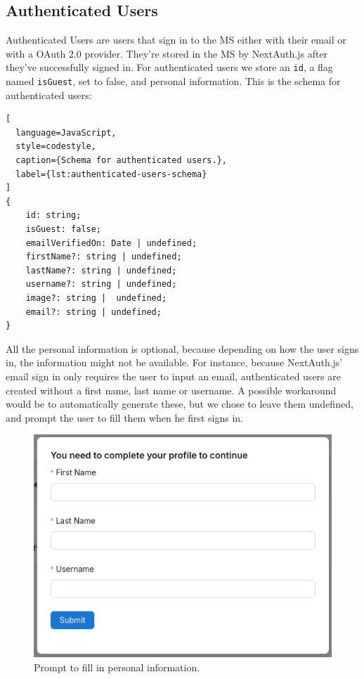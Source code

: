 \subsection{Authenticated Users}
\label{cha:ms-architecture:authenticated-users}

Authenticated Users are users that sign in to the MS either with their email or with a
OAuth 2.0 provider.
They're stored in the MS by NextAuth.js after they've successfully signed in.
For authenticated users we store an \lstinline{id}, a flag named \lstinline{isGuest}, set
to false, and personal information. 
This is the schema for authenticated users:


\begin{lstlisting}[
  language=JavaScript,
  style=codestyle,
  caption={Schema for authenticated users.},
  label={lst:authenticated-users-schema}
]
{
    id: string;
    isGuest: false;
    emailVerifiedOn: Date | undefined;
    firstName?: string | undefined;
    lastName?: string | undefined;
    username?: string | undefined;
    image?: string |  undefined;
    email?: string | undefined;
}

\end{lstlisting}

All the personal information is optional, because depending on how the user signs in, the
information might not be available.
For instance, because NextAuth.js' email sign in only requires the user to input an
email, authenticated users are created without a first name, last name or username.
A possible workaround would be to automatically generate these, but we chose to leave them
undefined, and prompt the user to fill them when he first signs in.


\begin{figure}[H]
    \centering
    \includegraphics[scale=0.4]{images/fill-data-prompt.png}
    \caption{Prompt to fill in personal information.}
    \vspace{-1em} %
    \label{fig:prompt-fill-personal-information}
\end{figure}

